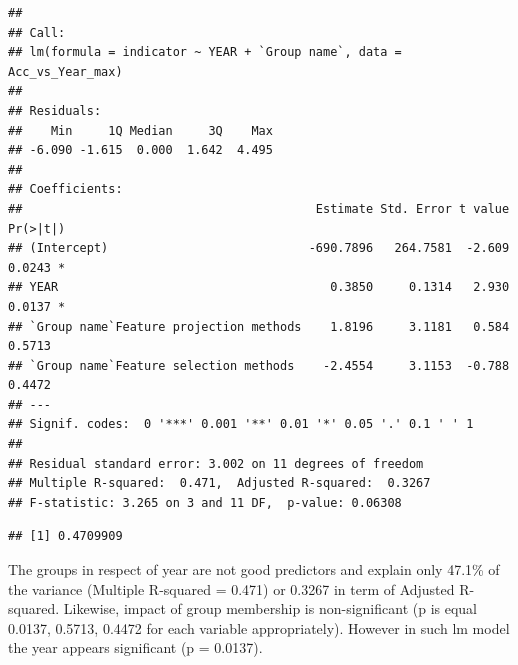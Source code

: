 \documentclass[
]{article}
\newenvironment{Shaded}{\begin{snugshade}}{\end{snugshade}}
\newcommand{\FunctionTok}[1]{\textcolor[rgb]{0.00,0.00,0.00}{#1}}
\newcommand{\NormalTok}[1]{#1}
\newcommand{\SpecialCharTok}[1]{\textcolor[rgb]{0.00,0.00,0.00}{#1}}
\begin{document}
\begin{verbatim}
## 
## Call:
## lm(formula = indicator ~ YEAR + `Group name`, data = Acc_vs_Year_max)
## 
## Residuals:
##    Min     1Q Median     3Q    Max 
## -6.090 -1.615  0.000  1.642  4.495 
## 
## Coefficients:
##                                         Estimate Std. Error t value Pr(>|t|)  
## (Intercept)                            -690.7896   264.7581  -2.609   0.0243 *
## YEAR                                      0.3850     0.1314   2.930   0.0137 *
## `Group name`Feature projection methods    1.8196     3.1181   0.584   0.5713  
## `Group name`Feature selection methods    -2.4554     3.1153  -0.788   0.4472  
## ---
## Signif. codes:  0 '***' 0.001 '**' 0.01 '*' 0.05 '.' 0.1 ' ' 1
## 
## Residual standard error: 3.002 on 11 degrees of freedom
## Multiple R-squared:  0.471,  Adjusted R-squared:  0.3267 
## F-statistic: 3.265 on 3 and 11 DF,  p-value: 0.06308
\end{verbatim}

\begin{Shaded}
\end{Shaded}

\begin{verbatim}
## [1] 0.4709909
\end{verbatim}

The groups in respect of year are not good predictors and explain only 47.1\% of the variance (Multiple R-squared = 0.471) or 0.3267 in term of Adjusted R-squared. Likewise, impact of group membership is non-significant (p is equal 0.0137, 0.5713, 0.4472 for each variable appropriately). However in such lm model the year appears significant (p = 0.0137).
\end{document}
